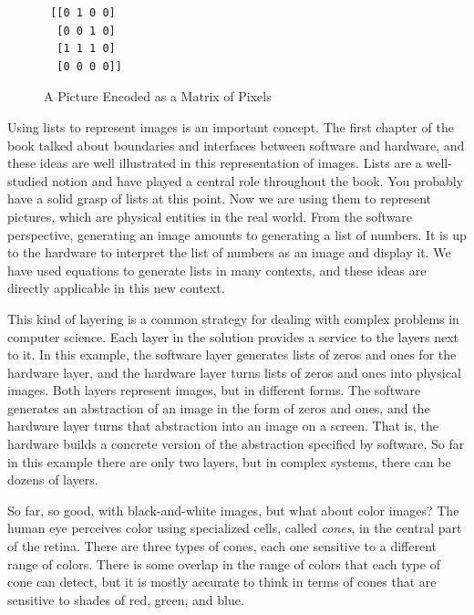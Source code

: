 \begin{figure}
\begin{center}
\begin{minipage}{3cm}
\begin{verbatim}
 [[0 1 0 0]
  [0 0 1 0]
  [1 1 1 0]
  [0 0 0 0]]
\end{verbatim}
\end{minipage}%
\begin{minipage}{3cm}
\end{minipage}
\end{center}
\caption{A Picture Encoded as a Matrix of Pixels}
\label{fig:glider-in-images}
\end{figure}

Using lists to represent images is an important concept.
The first chapter of the book talked about boundaries
and interfaces between software and hardware, and these ideas are
well illustrated in this representation of images.
Lists are a well-studied notion and have played a central
role throughout the book.
You probably have a solid grasp of lists at this point.
Now we are using them to represent pictures, which are
physical entities in the real world.
From the software perspective,
generating an image amounts to generating a list of numbers.
It is up to the hardware to interpret the list of numbers
as an image and display it.
We have used equations to generate lists in many contexts,
and these ideas are directly applicable in this new context.

This kind of layering is a common strategy for dealing
with complex problems in computer science.
Each layer in the solution provides a service
to the layers next to it. In this example,
the software layer generates lists of zeros and ones
for the hardware layer, and
the hardware layer turns lists of zeros and ones into physical images.
Both layers represent images, but in different forms.
The software generates an abstraction of an image
in the form of zeros and ones,
and the hardware layer turns that abstraction into an
image on a screen. That is, the hardware builds a
concrete version of the abstraction specified by software.
So far in this example there are only two layers,
but in complex systems, there can be dozens of layers.

So far, so good, with black-and-white images,
but what about color images?
The human eye perceives
color using specialized cells, called \emph{cones}, in the central
part of the retina. There are three types of cones, each one sensitive
to a different range of colors. There is some overlap in the range
of colors that each type of cone can detect, but it is mostly accurate
to think in terms of cones that are sensitive to shades of red, green,
and blue.

